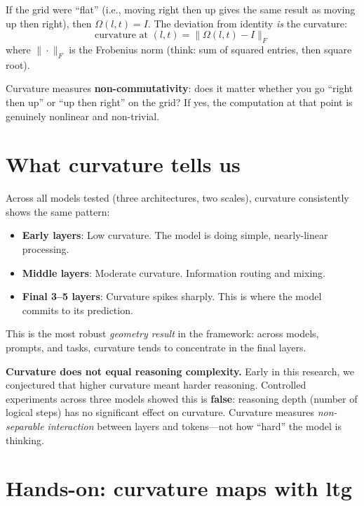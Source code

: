 \documentclass[11pt, twoside, openright]{memoir}
\begin{document}
If the grid were ``flat'' (i.e., moving right then up gives the same result
as moving up then right), then $\Omega(l,t) = I$. The deviation from
identity \emph{is} the curvature:
\[
  \text{curvature at } (l,t) = \|\Omega(l,t) - I\|_F
\]
where $\|\cdot\|_F$ is the Frobenius norm (think: sum of squared entries,
then square root).

\begin{keyidea}
Curvature measures \textbf{non-commutativity}: does it matter whether you
go ``right then up'' or ``up then right'' on the grid? If yes, the
computation at that point is genuinely nonlinear and non-trivial.
\end{keyidea}

\section{What curvature tells us}

\begin{finding}
Across all models tested (three architectures, two scales), curvature
consistently shows the same pattern:

\begin{itemize}[nosep]
\item \textbf{Early layers}: Low curvature. The model is doing simple,
  nearly-linear processing.
\item \textbf{Middle layers}: Moderate curvature. Information routing
  and mixing.
\item \textbf{Final 3--5 layers}: Curvature spikes sharply. This is
  where the model commits to its prediction.
\end{itemize}

This is the most robust \emph{geometry result} in the framework: across
models, prompts, and tasks, curvature tends to concentrate in the final
layers.
\end{finding}

\begin{pitfall}
\textbf{Curvature does not equal reasoning complexity.} Early in this
research, we conjectured that higher curvature meant harder reasoning.
Controlled experiments across three models showed this is \textbf{false}:
reasoning depth (number of logical steps) has no significant effect on
curvature. Curvature measures \emph{non-separable interaction} between
layers and tokens---not how ``hard'' the model is thinking.
\end{pitfall}

\section{Hands-on: curvature maps with ltg}
\end{document}
